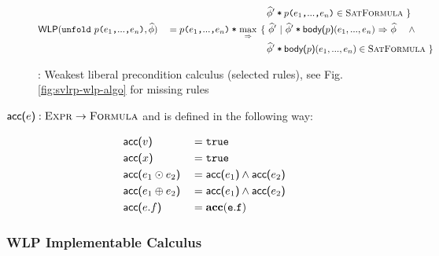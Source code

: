 \documentclass {llncs}
\begin{document}
\begin{figure}[ht!]
\begin{scenter}
\begin{alignat*}{2}
            &&& \quad\quad\quad\quad\quad\quad\quad\quad\quad\quad\,\,\,\, {\widehat{\phi}'}\:\textup{\texttt{*}}\:{\textup{\texttt{$p$($e_1$,$...$,$e_n$)}}} \in \textup{\textsc{SatFormula}} ~\}\\
            &\textup{\textmd{\textsf{WLP}}}(\textup{\texttt{unfold}}~{\textup{\texttt{$p$($e_1$,$...$,$e_n$)}}}, \widehat{\phi})
            &&= {\textup{\texttt{$p$($e_1$,$...$,$e_n$)}}}\:\textup{\texttt{*}}\:{}
            \underset{{~} \,\,{\Rightarrow}\,\, {~}}{\max}~ \{~ \widehat{\phi}' ~|~ {{\widehat{\phi}'}\:\textup{\texttt{*}}\:{\textup{\textmd{\textsf{body($p$)}}}(e_1,...,e_n)}} \,\,{\Rightarrow}\,\, {\widehat{\phi}} ~~~~\wedge\\
            &&& \quad\quad\quad\quad\quad\quad\quad\quad\quad\quad\,\,\,\, {\widehat{\phi}'}\:\textup{\texttt{*}}\:{\textup{\textmd{\textsf{body($p$)}}}(e_1,...,e_n)} \in \textup{\textsc{SatFormula}} ~\}\\
        \end{alignat*}
    \end{scenter}
    \caption{\svlrp: Weakest liberal precondition calculus (selected rules), see Fig. \ref{fig:svlrp-wlp-algo} for missing rules}
    \label{fig:svlrp-wlp-selected}
\end{figure}

$\textup{\textmd{\textsf{acc($e$)}}} : \textup{\textsc{Expr}} \rightarrow \textup{\textsc{Formula}}$ and is defined in the following way:
 
  \begin{scenter}
        \begin{alignat*}{2}
        	    & \textup{\textmd{\textsf{acc($v$)}}}
            &&= \textup{\texttt{true}} \\
            & \textup{\textmd{\textsf{acc($x$)}}}
            &&= \textup{\texttt{true}} \\
            & \textup{\textmd{\textsf{acc($e_1 \odot e_2$)}}}
            &&= \textup{\textmd{\textsf{acc($e_1$)}}} \wedge \textup{\textmd{\textsf{acc($e_2$)}}} \\
            & \textup{\textmd{\textsf{acc($e_1 \oplus e_2$)}}}
            &&= \textup{\textmd{\textsf{acc($e_1$)}}} \wedge \textup{\textmd{\textsf{acc($e_2$)}}} \\
            & \textup{\textmd{\textsf{acc($e.f$)}}}
            &&= \mathtt{\textbf{acc}(e.f)}
        \end{alignat*}
    \end{scenter}
\clearpage
\subsubsection{WLP Implementable Calculus} \hspace{0.3cm}

\end{document}
